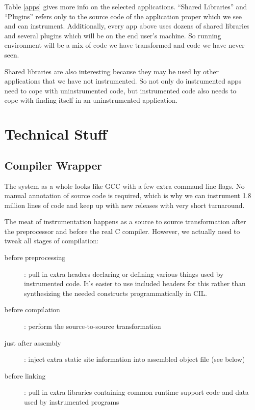 \documentclass[times,10pt,twocolumn]{article}
\begin{document}
Table \ref{apps} gives more info on the selected applications.
``Shared Libraries'' and ``Plugins'' refers only to the source code of
the application proper which we see and can instrument.  Additionally,
every app above uses dozens of shared libraries and several plugins
which will be on the end user's machine.  So running environment will
be a mix of code we have transformed and code we have never seen.

Shared libraries are also interesting because they may be used by
other applications that we have not instrumented.  So not only do
instrumented apps need to cope with uninstrumented code, but
instrumented code also needs to cope with finding itself in an
uninstrumented application.

\section{Technical Stuff}

\subsection{Compiler Wrapper}

The system as a whole looks like GCC with a few extra command line
flags.  No manual annotation of source code is required, which is why
we can instrument 1.8 million lines of code and keep up with new
releases with very short turnaround.

The meat of instrumentation happens as a source to source
transformation after the preprocessor and before the real C compiler.
However, we actually need to tweak all stages of compilation:

\begin{description}
\item[before preprocessing]: pull in extra headers declaring or
  defining various things used by instrumented code.  It's easier to
  use included headers for this rather than synthesizing the needed
  constructs programmatically in CIL.
\item[before compilation]: perform the source-to-source transformation
\item[just after assembly]: inject extra static site information into
  assembled object file (see below)
\item[before linking]: pull in extra libraries containing common
  runtime support code and data used by instrumented programs
\end{description}
\end{document}
